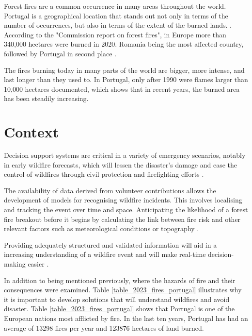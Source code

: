 Forest fires are a common occurrence in many areas throughout the world. Portugal is a geographical location that stands out not only in terms of the number of occurrences, but also in terms of the extent of the burned lands. \cite{silva2012}.
According to the "Commission report on forest fires", in Europe more than 340,000 hectares were burned in 2020. Romania being the most affected country, followed by Portugal in second place \cite{ec2021forestfires}.




The fires burning today in many parts of the world are bigger, more intense, and last longer than they used to. In Portugal, only after 1990 were flames larger than 10,000 hectares documented, which shows that in recent years, the burned area has been steadily increasing\cite{viegas2018wildfires}.




\section{Context}
\label{subsec:sec1}

Decision support systems are critical in a variety of emergency scenarios, notably in early wildfire forecasts, which will lessen the disaster's damage and ease the control of wildfires through civil protection and firefighting efforts \cite{DEI2023}.


The availability of data derived from volunteer contributions allows the development of models for recognising wildfire incidents.
This involves localising and tracking the event over time and space. Anticipating the likelihood of a forest fire breakout before it begins by calculating the link between fire risk and other relevant factors such as meteorological conditions or topography \cite{DEI2023}. 


Providing adequately structured and validated information will aid in a increasing understanding of a wildfire event and will make real-time decision-making easier \cite{Abid2021, DEI2023}.

In addition to being mentioned previously, where the hazards of fire and their consequences were examined. Table \ref{table_2023_fires_portugal} illustrates why it is important to develop solutions that will understand wildfires and avoid disaster. Table \ref{table_2023_fires_portugal} shows that Portugal is one of the European nations most afflicted by fire. In the last ten years, Portugal has had an average of 13298 fires per year and 123876 hectares of land burned. 


